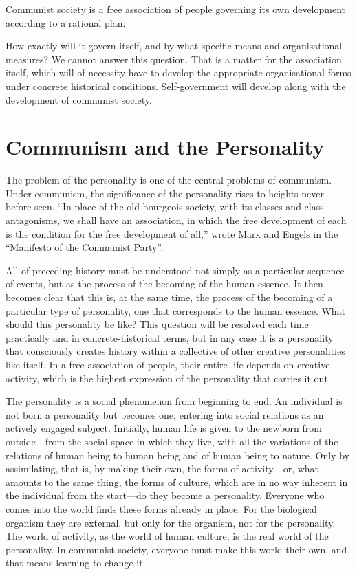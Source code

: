 \documentclass[12pt,a4paper,openany]{book}
\begin{document}
Communist society is a free association of people governing its own development according to a rational plan.

How exactly will it govern itself, and by what specific means and organisational measures? We cannot answer this question. That is a matter for the association itself, which will of necessity have to develop the appropriate organisational forms under concrete historical conditions. Self-government will develop along with the development of communist society.
\ifSubfilesClassLoaded{\setcounter{page}{47}}{}
\section{Communism and the Personality}
\label{sec:08_communism_personality}

The problem of the personality is one of the central problems of communism. Under communism, the significance of the personality rises to heights never before seen. “In place of the old bourgeois society, with its classes and class antagonisms, we shall have an association, in which the free development of each is the condition for the free development of all,” wrote Marx and Engels in the “Manifesto of the Communist Party”.

All of preceding history must be understood not simply as a particular sequence of events, but as the process of the becoming of the human essence. It then becomes clear that this is, at the same time, the process of the becoming of a particular type of personality, one that corresponds to the human essence. What should this personality be like? This question will be resolved each time practically and in concrete-historical terms, but in any case it is a personality that consciously creates history within a collective of other creative personalities like itself. In a free association of people, their entire life depends on creative activity, which is the highest expression of the personality that carries it out.

The personality is a social phenomenon from beginning to end. An individual is not born a personality but becomes one, entering into social relations as an actively engaged subject. Initially, human life is given to the newborn from outside—from the social space in which they live, with all the variations of the relations of human being to human being and of human being to nature. Only by assimilating, that is, by making their own, the forms of activity—or, what amounts to the same thing, the forms of culture, which are in no way inherent in the individual from the start—do they become a personality. Everyone who comes into the world finds these forms already in place. For the biological organism they are external, but only for the organism, not for the personality. The world of activity, as the world of human culture, is the real world of the personality. In communist society, everyone must make this world their own, and that means learning to change it.
\end{document}
